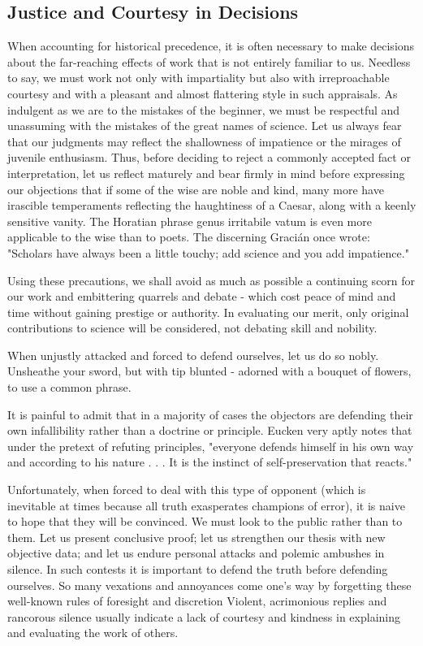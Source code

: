 \documentclass{article}
\begin{document}
\subsection*{Justice and Courtesy in Decisions}

When accounting for historical precedence, it is often necessary to make decisions about the far-reaching effects of work that is not entirely familiar to us. Needless to say, we must work not only with impartiality but also with irreproachable courtesy and with a pleasant and almost flattering style in such appraisals. As indulgent as we are to the mistakes of the beginner, we must be respectful and unassuming with the mistakes of the great names of science. Let us always fear that our judgments may reflect the shallowness of impatience or the mirages of juvenile enthusiasm. Thus, before deciding to reject a commonly accepted fact or interpretation, let us reflect maturely and bear firmly in mind before expressing our objections that if some of the wise are noble and kind, many more have irascible temperaments reflecting the haughtiness of a Caesar, along with a keenly sensitive vanity. The Horatian phrase genus irritabile vatum is even more applicable to the wise than to poets. The discerning Gracián once wrote: "Scholars have always been a little touchy; add science and you add impatience."

Using these precautions, we shall avoid as much as possible a continuing scorn for our work and embittering quarrels and debate - which cost peace of mind and time without gaining prestige or authority. In evaluating our merit, only original contributions to science will be considered, not debating skill and nobility.

When unjustly attacked and forced to defend ourselves, let us do so nobly. Unsheathe your sword, but with tip blunted - adorned with a bouquet of flowers, to use a common phrase.

It is painful to admit that in a majority of cases the objectors are defending their own infallibility rather than a doctrine or principle. Eucken very aptly notes that under the pretext of refuting principles, "everyone defends himself in his own way and according to his nature . . . It is the instinct of self-preservation that reacts."

Unfortunately, when forced to deal with this type of opponent (which is inevitable at times because all truth exasperates champions of error), it is naive to hope that they will be convinced. We must look to the public rather than to them. Let us present conclusive proof; let us strengthen our thesis with new objective data; and let us endure personal attacks and polemic ambushes in silence. In such contests it is important to defend the truth before defending ourselves. So many vexations and annoyances come one’s way by forgetting these well-known rules of foresight and discretion\! Violent, acrimonious replies and rancorous silence usually indicate a lack of courtesy and kindness in explaining and evaluating the work of others.
\end{document}
